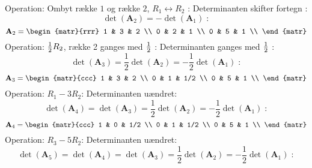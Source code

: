 \begin{example}
Operation: Ombyt række $1$ og række $2$, $R_{1} \leftrightarrow R_{2}$ : Determinanten skifter fortegn :
\begin{equation}
\det(\mathbf{A}_{2}) = -\det(\mathbf{A}_{1}) \;:
\end{equation}
\begin{equation}
\mathbf{A}_{2} =  \begin{matr}{rrr}
             1 & 3 & 2 \\
             0 & 2 & 1 \\
             0 & 5 & 1 \\
           \end{matr}
\end{equation}
Operation: $\tiny{\frac{1}{2}}R_{2}$, række 2 ganges med $\tiny{\frac{1}{2}}$  : Determinanten ganges med $\tiny{\frac{1}{2}}$ :
\begin{equation}
\det(\mathbf{A}_{3}) = \frac{1}{2}\det(\mathbf{A}_{2}) = -\frac{1}{2}\det(\mathbf{A}_{1}) \;:
\end{equation}
\begin{equation}
\mathbf{A}_{3} =  \begin{matr}{ccc}
             1 & 3 & 2 \\
             0 & 1 & 1/2 \\
             0 & 5 & 1 \\
           \end{matr}
\end{equation}
Operation: $R_{1}- 3R_{2}$: Determinanten uændret:
\begin{equation}
\det(\mathbf{A}_{4}) =   \det(\mathbf{A}_{3}) = \frac{1}{2}\det(\mathbf{A}_{2}) = -\frac{1}{2}\det(\mathbf{A}_{1}) \; :
\end{equation}
\begin{equation}
\mathbf{A}_{4} =  \begin{matr}{ccc}
             1 & 0 & 1/2 \\
             0 & 1 & 1/2 \\
             0 & 5 & 1 \\
           \end{matr}
\end{equation}
Operation: $R_{3}- 5R_{2}$: Determinanten uændret:
    \begin{equation}
    \det(\mathbf{A}_{5}) =  \det(\mathbf{A}_{4}) =   \det(\mathbf{A}_{3}) = \frac{1}{2}\det(\mathbf{A}_{2}) = -\frac{1}{2}\det(\mathbf{A}_{1}) \;:
    \end{equation}
\begin{equation}

\end{equation}
\end{example}
